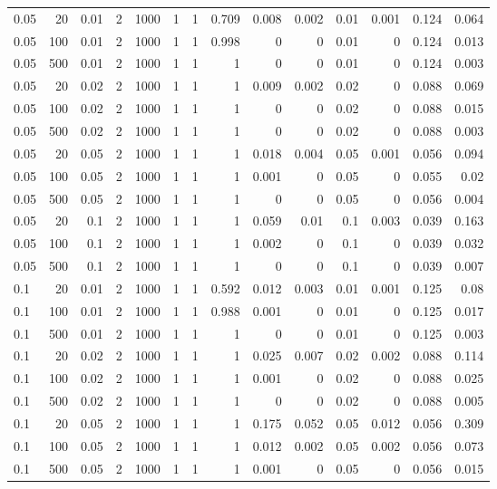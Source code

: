 \begin{table}[!htbp]
\begin{tabular}{lrrrrrrrrrrrrr}
0.05 & 20 & 0.01 & 2 & 1000 & 1 & 1 & 0.709 & 0.008 & 0.002 & 0.01 & 0.001 & 0.124 & 0.064 \\
0.05 & 100 & 0.01 & 2 & 1000 & 1 & 1 & 0.998 & 0 & 0 & 0.01 & 0 & 0.124 & 0.013 \\
0.05 & 500 & 0.01 & 2 & 1000 & 1 & 1 & 1 & 0 & 0 & 0.01 & 0 & 0.124 & 0.003 \\
0.05 & 20 & 0.02 & 2 & 1000 & 1 & 1 & 1 & 0.009 & 0.002 & 0.02 & 0 & 0.088 & 0.069 \\
0.05 & 100 & 0.02 & 2 & 1000 & 1 & 1 & 1 & 0 & 0 & 0.02 & 0 & 0.088 & 0.015 \\
0.05 & 500 & 0.02 & 2 & 1000 & 1 & 1 & 1 & 0 & 0 & 0.02 & 0 & 0.088 & 0.003 \\
0.05 & 20 & 0.05 & 2 & 1000 & 1 & 1 & 1 & 0.018 & 0.004 & 0.05 & 0.001 & 0.056 & 0.094 \\
0.05 & 100 & 0.05 & 2 & 1000 & 1 & 1 & 1 & 0.001 & 0 & 0.05 & 0 & 0.055 & 0.02 \\
0.05 & 500 & 0.05 & 2 & 1000 & 1 & 1 & 1 & 0 & 0 & 0.05 & 0 & 0.056 & 0.004 \\
0.05 & 20 & 0.1 & 2 & 1000 & 1 & 1 & 1 & 0.059 & 0.01 & 0.1 & 0.003 & 0.039 & 0.163 \\
0.05 & 100 & 0.1 & 2 & 1000 & 1 & 1 & 1 & 0.002 & 0 & 0.1 & 0 & 0.039 & 0.032 \\
0.05 & 500 & 0.1 & 2 & 1000 & 1 & 1 & 1 & 0 & 0 & 0.1 & 0 & 0.039 & 0.007 \\
0.1 & 20 & 0.01 & 2 & 1000 & 1 & 1 & 0.592 & 0.012 & 0.003 & 0.01 & 0.001 & 0.125 & 0.08 \\
0.1 & 100 & 0.01 & 2 & 1000 & 1 & 1 & 0.988 & 0.001 & 0 & 0.01 & 0 & 0.125 & 0.017 \\
0.1 & 500 & 0.01 & 2 & 1000 & 1 & 1 & 1 & 0 & 0 & 0.01 & 0 & 0.125 & 0.003 \\
0.1 & 20 & 0.02 & 2 & 1000 & 1 & 1 & 1 & 0.025 & 0.007 & 0.02 & 0.002 & 0.088 & 0.114 \\
0.1 & 100 & 0.02 & 2 & 1000 & 1 & 1 & 1 & 0.001 & 0 & 0.02 & 0 & 0.088 & 0.025 \\
0.1 & 500 & 0.02 & 2 & 1000 & 1 & 1 & 1 & 0 & 0 & 0.02 & 0 & 0.088 & 0.005 \\
0.1 & 20 & 0.05 & 2 & 1000 & 1 & 1 & 1 & 0.175 & 0.052 & 0.05 & 0.012 & 0.056 & 0.309 \\
0.1 & 100 & 0.05 & 2 & 1000 & 1 & 1 & 1 & 0.012 & 0.002 & 0.05 & 0.002 & 0.056 & 0.073 \\
0.1 & 500 & 0.05 & 2 & 1000 & 1 & 1 & 1 & 0.001 & 0 & 0.05 & 0 & 0.056 & 0.015 \\

\end{tabular}
\end{table}
